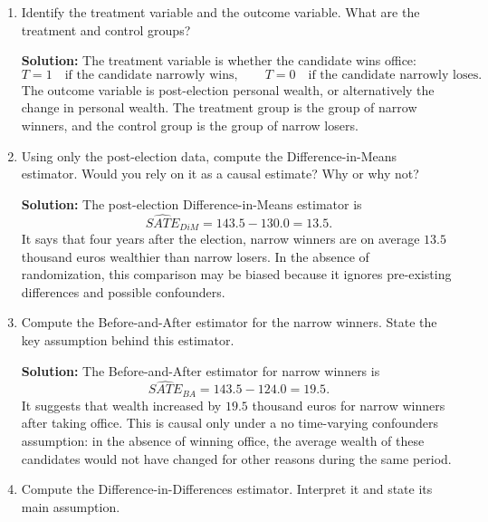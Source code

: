 \documentclass[11pt]{exam}
\begin{document}
\begin{questions}
\begin{enumerate}[leftmargin = 0.5cm, label = (\alph*), rightmargin = 0.2cm]
    \item Identify the treatment variable and the outcome variable. What are the treatment and control groups?

    \begin{solutionorbox}[4.2cm]
    \textbf{Solution:} The treatment variable is whether the candidate wins office:
    \[
    T=1 \quad \text{if the candidate narrowly wins}, \qquad T=0 \quad \text{if the candidate narrowly loses}.
    \]
    The outcome variable is post-election personal wealth, or alternatively the change in personal wealth. The treatment group is the group of narrow winners, and the control group is the group of narrow losers.
    \end{solutionorbox}

    \item Using only the post-election data, compute the Difference-in-Means estimator. Would you rely on it as a causal estimate? Why or why not?

    \begin{solutionorbox}[5.5cm]
    \textbf{Solution:} The post-election Difference-in-Means estimator is
    \[
    \widehat{SATE}_{DiM}=143.5-130.0=13.5.
    \]
    It says that four years after the election, narrow winners are on average $13.5$ thousand euros wealthier than narrow losers. In the absence of randomization, this comparison may be biased because it ignores pre-existing differences and possible confounders.
    \end{solutionorbox}

    \item Compute the Before-and-After estimator for the narrow winners. State the key assumption behind this estimator.

    \begin{solutionorbox}[5.5cm]
    \textbf{Solution:} The Before-and-After estimator for narrow winners is
    \[
    \widehat{SATE}_{BA}=143.5-124.0=19.5.
    \]
    It suggests that wealth increased by $19.5$ thousand euros for narrow winners after taking office. This is causal only under a no time-varying confounders assumption: in the absence of winning office, the average wealth of these candidates would not have changed for other reasons during the same period.
    \end{solutionorbox}

    \item Compute the Difference-in-Differences estimator. Interpret it and state its main assumption.


\end{enumerate}
\end{questions}
\end{document}
